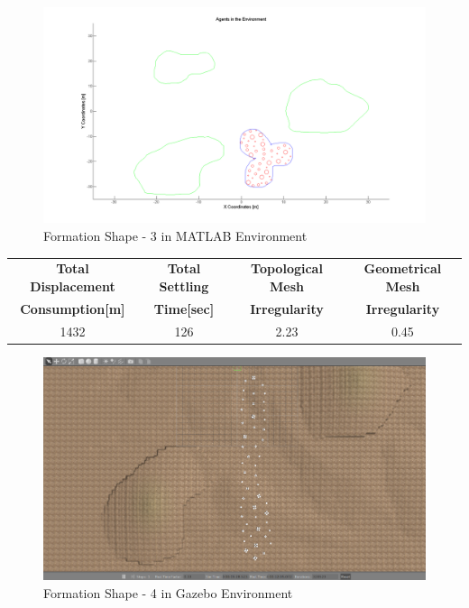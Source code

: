 \begin{figure}[H]
\caption{Formation Shape - 3 in MATLAB Environment}
\centerline{\includegraphics[scale = 0.40]{3}}
\end{figure} 
				 
\begin{center}
 \label{tab:title} 
\begin{tabular}{||c| c |c |c ||}
\hline
\textbf{Total Displacement }  & \textbf{Total Settling} & \textbf{Topological Mesh} & \textbf{Geometrical Mesh} \\ \textbf{Consumption[m]} & \textbf{Time[sec]}& \textbf{Irregularity} & \textbf{Irregularity} \\
\hline
1432 & 126 &  2.23& 0.45\\
\hline
\end{tabular}
\end{center}
				 
\begin{figure}[H]
\caption{Formation Shape - 4 in Gazebo Environment}
\centerline{\includegraphics[scale = 0.35]{4_Gazebo}}
\end{figure} 
			
